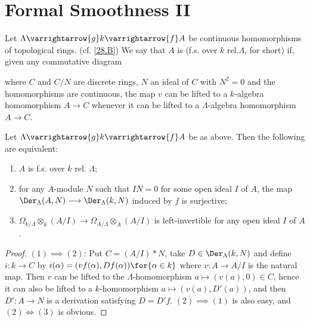 \documentclass[../main]{subfiles}
\begin{document}
\section{Formal Smoothness II}\label{sec:30}
\begin{pardefinition}
Let $\Lambda \varrightarrow{g} k \varrightarrow{f} A$ be continuous homomorphisms of topological rings. (cf. \ref{28.B}) We say that $A$ is  (f.s. over $k$ rel.$\Lambda$, for short) if, given any commutative diagram 
\begin{center}
\end{center}
where $C$ and $C/N$ are discrete rings, $N$ an ideal of $C$ with $N^2 = 0$ and the homomorphisms are continuous, the map $v$ can be lifted to a $k$-algebra homomorphism $A \longrightarrow C$ whenever it can be lifted to a $\Lambda$-algebra homomorphism $A \longrightarrow C$.
\end{pardefinition}

\begin{theorem}
\label{thm:065}
Let $\Lambda \varrightarrow{g} k \varrightarrow{f} A$ be as above. Then the following are equivalent: 

\begin{enumerate}[label= (\arabic*)]
    \item $A$ is f.s. over $k$ rel. $\Lambda$;
    \item for any $A$-module $N$ such that $IN = 0$ for some open ideal $I$ of $A$, the map $\Der_\Lambda(A, N) \longrightarrow \Der_\Lambda(k, N)$ induced by $f$ is surjective; 
    \item $\Omega_{k/\Lambda} \otimes_k (A/I) \longrightarrow \Omega_{A/\Lambda} \otimes_A (A/I)$ is left-invertible for any open ideal $I$ of $A$. 
\end{enumerate}
\end{theorem}

\begin{proof}
$(1) \implies (2)$: Put $C = (A/I) \ast N$, take $D \in \Der_\Lambda(k, N)$ and define $i : k \longrightarrow C$ by $i(\alpha) = (v f(\alpha), D f(\alpha))\for{\alpha \in k}$ where $v : A \longrightarrow A/I$ is the natural map. Then $v$ can be lifted to the $\Lambda$-homomorphism $a \mapsto (v(a), 0) \in C$, hence it can also be lifted to a $k$-homomorphism $a \mapsto (v(a), D'(a))$, and then $D' : A \longrightarrow N$ is a derivation satisfying $D = D'f$. $(2) \implies (1)$ is also easy, and $(2) \iff (3)$ is obvious.
\end{proof}
\end{document}
